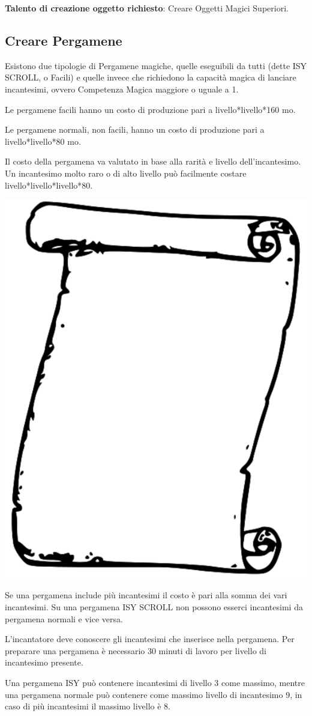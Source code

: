 \begin{multicols}{2}
	\textbf{Talento di creazione oggetto richiesto}: Creare Oggetti Magici Superiori.

	\subsection{Creare Pergamene}
	\medskip

	Esistono due tipologie di Pergamene magiche, quelle eseguibili da tutti (dette ISY SCROLL, o Facili) e quelle invece che richiedono la capacità magica di lanciare incantesimi, ovvero Competenza Magica maggiore o uguale a 1.

	Le pergamene facili hanno un costo di produzione pari a livello*livello*160 mo.

	Le pergamene normali, non facili, hanno un costo di produzione pari a livello*livello*80 mo.

	Il costo della pergamena va valutato in base alla rarità e livello dell'incantesimo. Un incantesimo molto raro o di alto livello può facilmente costare livello*livello*livello*80.

	\begin{center}
		\includegraphics[width=0.4\linewidth]{immagini/scroll3.png}
	\end{center}

	Se una pergamena include più incantesimi il costo è pari alla somma dei vari incantesimi. Su una pergamena ISY SCROLL non possono esserci incantesimi da pergamena normali e vice versa.

	L'incantatore deve conoscere gli incantesimi che inserisce nella pergamena. Per preparare una pergamena è necessario 30 minuti di lavoro per livello di incantesimo presente.

	Una pergamena ISY può contenere incantesimi di livello 3 come massimo, mentre una pergamena normale può contenere come massimo livello di incantesimo 9, in caso di più incantesimi il massimo livello è 8.


\end{multicols}
